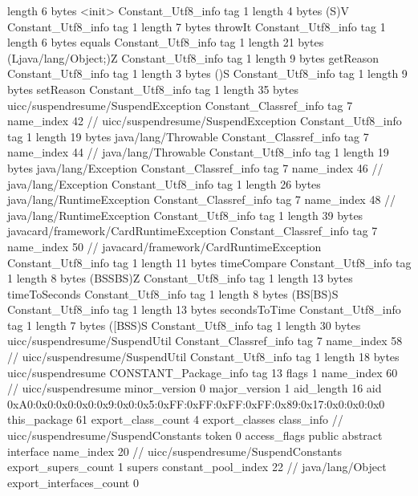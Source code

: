 {{{			length	6
			bytes	<init>
		}
		Constant_Utf8_info {
			tag	1
			length	4
			bytes	(S)V
		}
		Constant_Utf8_info {
			tag	1
			length	7
			bytes	throwIt
		}
		Constant_Utf8_info {
			tag	1
			length	6
			bytes	equals
		}
		Constant_Utf8_info {
			tag	1
			length	21
			bytes	(Ljava/lang/Object;)Z
		}
		Constant_Utf8_info {
			tag	1
			length	9
			bytes	getReason
		}
		Constant_Utf8_info {
			tag	1
			length	3
			bytes	()S
		}
		Constant_Utf8_info {
			tag	1
			length	9
			bytes	setReason
		}
		Constant_Utf8_info {
			tag	1
			length	35
			bytes	uicc/suspendresume/SuspendException
		}
		Constant_Classref_info {
			tag	7
			name_index	42		// uicc/suspendresume/SuspendException
		}
		Constant_Utf8_info {
			tag	1
			length	19
			bytes	java/lang/Throwable
		}
		Constant_Classref_info {
			tag	7
			name_index	44		// java/lang/Throwable
		}
		Constant_Utf8_info {
			tag	1
			length	19
			bytes	java/lang/Exception
		}
		Constant_Classref_info {
			tag	7
			name_index	46		// java/lang/Exception
		}
		Constant_Utf8_info {
			tag	1
			length	26
			bytes	java/lang/RuntimeException
		}
		Constant_Classref_info {
			tag	7
			name_index	48		// java/lang/RuntimeException
		}
		Constant_Utf8_info {
			tag	1
			length	39
			bytes	javacard/framework/CardRuntimeException
		}
		Constant_Classref_info {
			tag	7
			name_index	50		// javacard/framework/CardRuntimeException
		}
		Constant_Utf8_info {
			tag	1
			length	11
			bytes	timeCompare
		}
		Constant_Utf8_info {
			tag	1
			length	8
			bytes	(BSSBS)Z
		}
		Constant_Utf8_info {
			tag	1
			length	13
			bytes	timeToSeconds
		}
		Constant_Utf8_info {
			tag	1
			length	8
			bytes	(BS[BS)S
		}
		Constant_Utf8_info {
			tag	1
			length	13
			bytes	secondsToTime
		}
		Constant_Utf8_info {
			tag	1
			length	7
			bytes	([BSS)S
		}
		Constant_Utf8_info {
			tag	1
			length	30
			bytes	uicc/suspendresume/SuspendUtil
		}
		Constant_Classref_info {
			tag	7
			name_index	58		// uicc/suspendresume/SuspendUtil
		}
		Constant_Utf8_info {
			tag	1
			length	18
			bytes	uicc/suspendresume
		}
		CONSTANT_Package_info {
			tag	13
			flags	1
			name_index	60		// uicc/suspendresume
			minor_version	0
			major_version	1
			aid_length	16
			aid	0xA0:0x0:0x0:0x0:0x9:0x0:0x5:0xFF:0xFF:0xFF:0xFF:0x89:0x17:0x0:0x0:0x0
		}
	}
	this_package	61
	export_class_count	4
	export_classes {
		class_info {		// uicc/suspendresume/SuspendConstants
			token	0
			access_flags	public abstract interface
			name_index	20		// uicc/suspendresume/SuspendConstants
			export_supers_count	1
			supers {
				constant_pool_index	22		// java/lang/Object
			}
			export_interfaces_count	0
}}}

